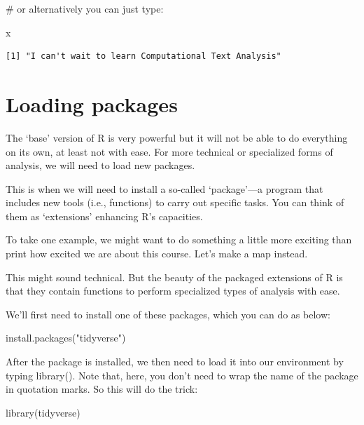 \documentclass[
  letterpaper,
  DIV=11,
  numbers=noendperiod]{scrreprt}
\newenvironment{Shaded}{\begin{snugshade}}{\end{snugshade}}
\newcommand{\CommentTok}[1]{\textcolor[rgb]{0.37,0.37,0.37}{#1}}
\newcommand{\FunctionTok}[1]{\textcolor[rgb]{0.28,0.35,0.67}{#1}}
\newcommand{\NormalTok}[1]{\textcolor[rgb]{0.00,0.23,0.31}{#1}}
\newcommand{\StringTok}[1]{\textcolor[rgb]{0.13,0.47,0.30}{#1}}
\begin{document}
\begin{Shaded}
\begin{Highlighting}[]
\CommentTok{\# or alternatively you can just type:}

\NormalTok{x}
\end{Highlighting}
\end{Shaded}

\begin{verbatim}
[1] "I can't wait to learn Computational Text Analysis"
\end{verbatim}

\hypertarget{loading-packages}{%
\section*{Loading packages}\label{loading-packages}}

The `base' version of R is very powerful but it will not be able to do
everything on its own, at least not with ease. For more technical or
specialized forms of analysis, we will need to load new packages.

This is when we will need to install a so-called `package'---a program
that includes new tools (i.e., functions) to carry out specific tasks.
You can think of them as `extensions' enhancing R's capacities.

To take one example, we might want to do something a little more
exciting than print how excited we are about this course. Let's make a
map instead.

This might sound technical. But the beauty of the packaged extensions of
R is that they contain functions to perform specialized types of
analysis with ease.

We'll first need to install one of these packages, which you can do as
below:

\begin{Shaded}
\begin{Highlighting}[]
\FunctionTok{install.packages}\NormalTok{(}\StringTok{"tidyverse"}\NormalTok{)}
\end{Highlighting}
\end{Shaded}

After the package is installed, we then need to load it into our
environment by typing library(). Note that, here, you don't need to wrap
the name of the package in quotation marks. So this will do the trick:

\begin{Shaded}
\begin{Highlighting}[]
\FunctionTok{library}\NormalTok{(tidyverse)}
\end{Highlighting}
\end{Shaded}
\end{document}
